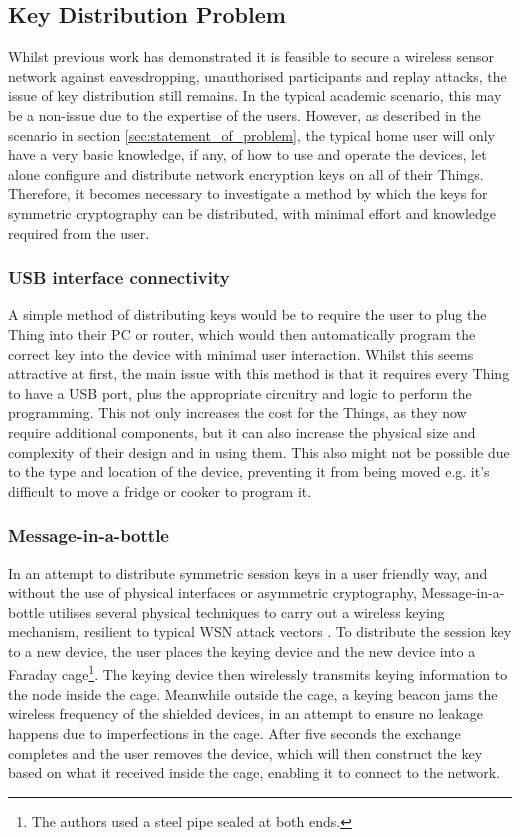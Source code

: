 \documentclass{mprop}
\begin{document}
\subsection{Key Distribution Problem} %
\label{sub:key_distribution_problem}

Whilst previous work has demonstrated it is feasible to secure a wireless sensor network against eavesdropping, unauthorised participants and replay attacks, the issue of key distribution still remains.
In the typical academic scenario, this may be a non-issue due to the expertise of the users. However, as described in the scenario in section \ref{sec:statement_of_problem}, the typical home user will only have a very basic knowledge, if any, of how to use and operate the devices, let alone configure and distribute network encryption keys on all of their Things. Therefore, it becomes necessary to investigate a method by which the keys for symmetric cryptography can be distributed, with minimal effort and knowledge required from the user.

\subsubsection{USB interface connectivity} %
\label{ssub:usb_interface_connectivity}
A simple method of distributing keys would be to require the user to plug the Thing into their PC or router, which would then automatically program the correct key into the device with minimal user interaction. Whilst this seems attractive at first, the main issue with this method is that it requires every Thing to have a USB port, plus the appropriate circuitry and logic to perform the programming. This not only increases the cost for the Things, as they now require additional components, but it can also increase the physical size and complexity of their design and in using them. This also might not be possible due to the type and location of the device, preventing it from being moved e.g. it's difficult to move a fridge or cooker to program it.

\subsubsection{Message-in-a-bottle} %
\label{ssub:message_in_a_bottle}
In an attempt to distribute symmetric session keys in a user friendly way, and without the use of physical interfaces or asymmetric cryptography, Message-in-a-bottle utilises several physical techniques to carry out a wireless keying mechanism, resilient to typical WSN attack vectors \cite{MessageBottle}. To distribute the session key to a new device, the user places the keying device and the new device into a Faraday cage\footnote{The authors used a steel pipe sealed at both ends.}. The keying device then wirelessly transmits keying information to the node inside the cage. Meanwhile outside the cage, a keying beacon jams the wireless frequency of the shielded devices, in an attempt to ensure no leakage happens due to imperfections in the cage. After five seconds the exchange completes and the user removes the device, which will then construct the key based on what it received inside the cage, enabling it to connect to the network.
\end{document}
